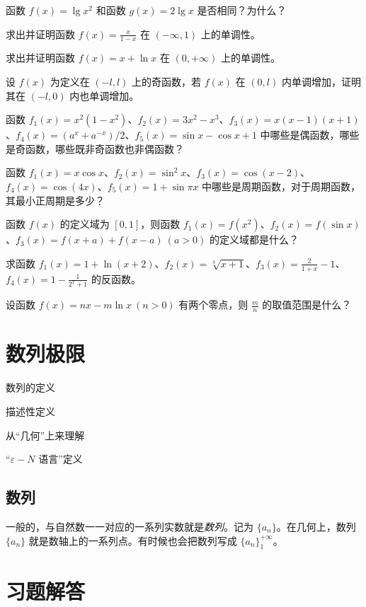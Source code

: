 \documentclass[lang=cn,10pt]{template}
\begin{document}
\begin{problemset}
  \item 函数 $f(x) = \lg x^2$ 和函数 $g(x) = 2 \lg x$ 是否相同？为什么？
  \item 求出并证明函数 $f(x) = \frac{x}{1-x}$ 在 $(-\infty, 1)$ 上的单调性。
  \item 求出并证明函数 $f(x) = x + \ln x$ 在 $(0, +\infty)$ 上的单调性。
  \item 设 $f(x)$ 为定义在 $(-l, l)$ 上的奇函数，若 $f(x)$ 在 $(0,l)$ 内单调增加，证明其在 $(-l, 0)$ 内也单调增加。
  \item 函数 $f_1(x) = x^2(1-x^2)$、$f_2(x) = 3x^2 - x^3$、$f_3(x) = x(x-1)(x+1)$、$f_4(x) = (a^x + a^{-x})/2$、$f_5(x) = \sin x - \cos x + 1$ 中哪些是偶函数，哪些是奇函数，哪些既非奇函数也非偶函数？
  \item 函数 $f_1(x) = x \cos x$、$f_2(x) = \sin^2 x$、$f_3(x) = \cos(x-2)$、$f_4(x) = \cos (4x)$、$f_5(x) = 1 + \sin \pi x$ 中哪些是周期函数，对于周期函数，其最小正周期是多少？
  \item 函数 $f(x)$ 的定义域为 $[0,1]$，则函数 $f_1(x)=f(x^2)$、$f_2(x)=f(\sin x)$、$f_3(x)=f(x+a) + f(x-a)\ (a>0)$ 的定义域都是什么？
  \item 求函数 $f_1(x) = 1 + \ln(x+2)$、$f_2(x) = \sqrt[3]{x+1}$、$f_3(x) = \frac{2}{1+x}-1$、$f_4(x) = 1-\frac{1}{2^x + 1}$ 的反函数。
  \item 设函数 $f(x) = nx - m \ln x \ (n>0)$ 有两个零点，则 $\frac mn$ 的取值范围是什么？ 
\end{problemset}

\chapter{数列极限}

\begin{introduction}
  \item 数列的定义
  \item 描述性定义
  \item 从“几何”上来理解
  \item “$\varepsilon-N$ 语言”定义
\end{introduction}
\section{数列}
一般的，与自然数一一对应的一系列实数就是\emph{数列}。记为 \emph{$\{a_n\}$}。在几何上，数列 $\{a_n\}$ 就是数轴上的一系列点。有时候也会把数列写成 $\{a_n\}_1^{+\infty}$。

\chapter{习题解答}
\end{document}
